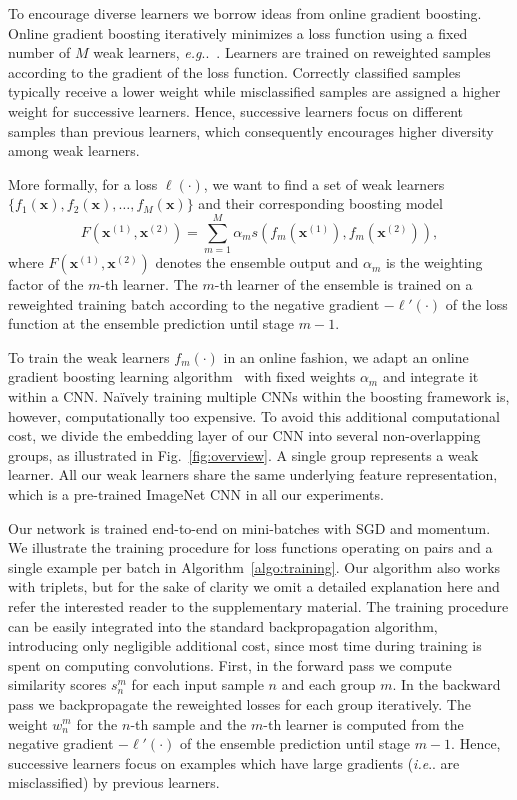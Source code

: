 \documentclass[10pt,journal,compsoc]{IEEEtran}
\makeatletter
\DeclareRobustCommand\onedot{\futurelet\@let@token\@onedot}
\def\@onedot{\ifx\@let@token.\else.\null\fi\xspace}
\def\eg{\emph{e.g}\onedot} \def\Eg{\emph{E.g}\onedot}
\def\ie{\emph{i.e}\onedot} \def\Ie{\emph{I.e}\onedot}
\makeatother
\begin{document}
To encourage diverse learners we borrow ideas from online gradient boosting.
Online gradient boosting iteratively minimizes a loss function using a fixed
number of $M$ weak learners, \eg~\cite{beygelzimer2015online,
beygelzimer2015optimal,  chen2012online, leistner2009robustness}. 
Learners are trained on reweighted samples according to the gradient of the
loss function. Correctly classified samples 
typically receive a lower weight while misclassified samples are assigned a higher weight for successive learners. 
Hence, successive learners focus on
different samples than previous learners, which consequently encourages higher
diversity among weak learners.

More formally, for a loss $\ell(\cdot)$, we want to find a set of weak learners
$\{f_1(\boldsymbol{x}), f_2(\boldsymbol{x}), \ldots, f_M(\boldsymbol{x})\}$ and their corresponding boosting model
\begin{equation}
F(\boldsymbol{x}^{(1)}, \boldsymbol{x}^{(2)}) = \sum_{m=1}^M \alpha_m s(f_m(\boldsymbol{x}^{(1)}), f_m(\boldsymbol{x}^{(2)})), 
\end{equation}
where $F(\boldsymbol{x}^{(1)}, \boldsymbol{x}^{(2)})$ denotes the ensemble output and $\alpha_m$ is the weighting factor of the $m$-th learner.
The $m$-th learner of the ensemble is trained on a reweighted training batch according to the negative gradient $-\ell'(\cdot)$ of 
the loss function at the ensemble prediction until stage $m-1$.

To train the weak learners $f_m(\cdot)$ in an online fashion, we
adapt an online gradient boosting learning algorithm~\cite{beygelzimer2015online} 
with fixed weights $\alpha_m$ and integrate it within a \ac{CNN}. Na\"ively
training multiple \acp{CNN} within the boosting framework is, however,
computationally too expensive.  To avoid this additional computational cost, we divide
the embedding layer of our \ac{CNN} into several non-overlapping groups, as
illustrated in Fig.~\ref{fig:overview}.  A single group represents a weak
learner. All our weak learners share the same underlying feature
representation, which is a pre-trained ImageNet \ac{CNN} in all our experiments.

Our network is trained end-to-end on mini-batches with \ac{SGD} and momentum. We illustrate the training 
procedure for loss functions operating on pairs and a single example per batch in Algorithm~\ref{algo:training}. 
Our algorithm also works with triplets, but for the sake of clarity we omit a detailed explanation here 
and refer the interested reader to the supplementary material.
The training procedure can be easily integrated
into the standard backpropagation algorithm, introducing only negligible additional cost, since most 
time during training is spent on computing convolutions.
First, in the forward pass we compute similarity scores $s_n^m$ for each input sample $n$ and each group $m$.
In the backward pass we backpropagate the reweighted losses for each group iteratively. The weight 
$w_n^m$ for the $n$-th sample and the $m$-th learner is computed from the negative gradient $-\ell'(\cdot)$ of the ensemble prediction until stage $m-1$. Hence, successive learners
focus on examples which have large gradients (\ie are misclassified) by previous learners.
\end{document}
